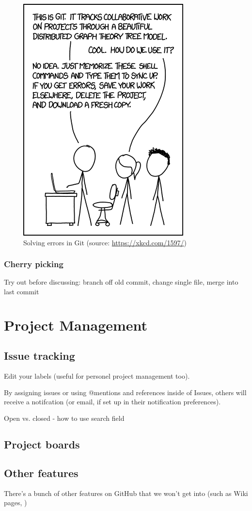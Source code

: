 \documentclass[12pt,letterpaper]{article}
\begin{document}
\begin{figure}[h]
	\centering
	\includegraphics[width=0.5\linewidth]{figs/gitreset.png}
	\caption{Solving errors in Git (source: \url{https://xkcd.com/1597/})}
	\label{fig:gitreset}
\end{figure}


\subsubsection{Cherry picking}
Try out before discussing: branch off old commit, change single file, merge into last commit




\section{Project Management}

\subsection{Issue tracking}

Edit your labels (useful for personel project management too).

By assigning issues or using @mentions and references inside of Issues, others will receive a notifcation (or email, if set up in their notification preferences).

Open vs. closed - how to use search field



\subsection{Project boards}


\subsection{Other features}
There's a bunch of other features on GitHub that we won't get into (such as Wiki pages, )
\end{document}
